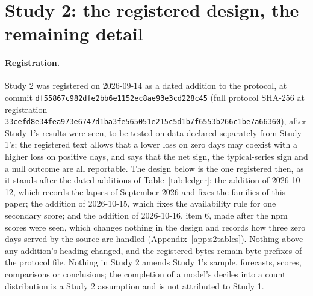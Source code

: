 \providecommand{\lm}{\texttt{local\_mean\_28}}
\providecommand{\aets}{\texttt{autoets\_weekly}}
\providecommand{\qs}{QScore9}
\providecommand{\hc}{\texttt{hurdle\_count\_28}}

\section{Study 2: the registered design, the remaining detail}
\label{app:s2design}

\begin{sloppypar}
\paragraph{Registration.} Study 2 was registered on 2026-09-14 as a dated addition to the protocol, at
commit \texttt{df55867c982dfe2bb6e1152ec8ae93e3cd228c45} (full protocol SHA-256 at registration
\texttt{33cefd8e34fea973e6747d1ba3fe565051e215c5d1b7f6553b266c1be7a66360}), after Study 1's results were
seen, to be tested on data declared separately from Study 1's; the registered text allows that a lower loss
on zero days may coexist with a higher loss on positive days, and says that the net sign, the typical-series
sign and a null outcome are all reportable. The design below is the one registered then, as it stands after
the dated additions of Table~\ref{tab:ledger}: the addition of 2026-10-12, which records the lapses of
September 2026 and fixes the families of this paper; the addition of 2026-10-15, which fixes the availability
rule for one secondary score; and the addition of 2026-10-16, item 6, made after the npm scores were seen,
which changes nothing in the design and records how three zero days served by the source are handled
(Appendix~\ref{app:s2tables}). Nothing above any addition's heading changed, and the registered bytes remain
byte prefixes of the protocol file. Nothing in Study 2 amends Study 1's sample, forecasts, scores,
comparisons or conclusions; the completion of a model's deciles into a count distribution is a Study 2
assumption and is not attributed to Study 1.
\end{sloppypar}

